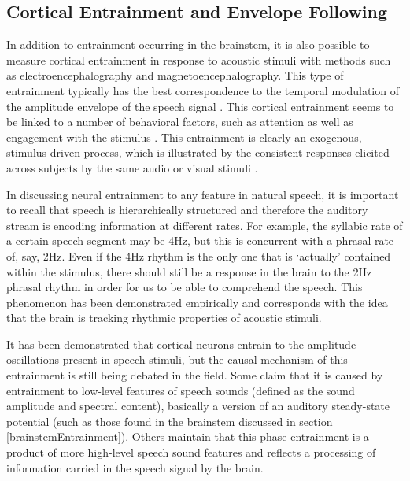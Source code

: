\documentclass[titlepage]{article}
\begin{document}
  \subsection{Cortical Entrainment and Envelope Following} \label{corticalEntrainment}

    In addition to entrainment occurring in the brainstem, it is also possible
    to measure cortical entrainment in response to acoustic stimuli with methods
    such as electroencephalography and magnetoencephalography. This type of
    entrainment typically has the best correspondence to the temporal
    modulation of the amplitude envelope of the speech signal
    \cite{Ding2014a,Ding2014,Nourski2009,Horton2014}. This cortical entrainment
    seems to be linked to a number of behavioral factors, such as attention
    \cite{Dmochowski2016,ZionGolumbic2013} as well as engagement with the
    stimulus \cite{Dmochowski2017}. This entrainment is clearly an exogenous,
    stimulus-driven process, which is illustrated by the consistent responses
    elicited across subjects by the same audio or visual stimuli
    \cite{Cohen2017,Petroni2017}.

    In discussing neural entrainment to any feature in natural speech, it is 
    important to recall that speech is hierarchically structured and therefore 
    the auditory stream is encoding information at different rates. For example,
    the syllabic rate of a certain speech segment may be 4Hz, but this is 
    concurrent with a phrasal rate of, say, 2Hz. Even if the 4Hz rhythm is the 
    only one that is `actually' contained within the stimulus, there should 
    still be a response in the brain to the 2Hz phrasal rhythm in order for 
    us to be able to comprehend the speech. This phenomenon has been demonstrated
    empirically \cite{Ding2015} and corresponds with the idea that the brain is
    tracking rhythmic properties of acoustic stimuli. 

    It has been demonstrated that cortical neurons entrain to the amplitude
    oscillations present in speech stimuli, but the causal mechanism of this
    entrainment is still being debated in the field. Some claim that it is
    caused by entrainment to low-level features of speech sounds 
    (defined as the sound amplitude and spectral content), basically a
    version of an auditory steady-state potential (such as those found in the
    brainstem discussed in section \ref{brainstemEntrainment}). Others
    maintain that this phase entrainment is a product of more
    high-level speech sound features and reflects a processing of information
    carried in the speech signal by the brain.
\end{document}
